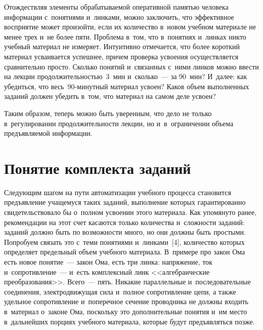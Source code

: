 \begin{multicols}{2}
  Отождествляя элементы обрабатываемой оперативной памятью человека 
информации с~понятиями и~линками, можно заключить, что эффективное 
восприятие может произойти, если их количество в~новом учебном материале 
не менее трех и~не более пяти. Проблема в~том, что в~понятиях и~линках никто 
учебный материал не измеряет. Интуитивно отмечается, что более короткий 
материал усваивается успешнее, причем проверка усвоения осуществляется 
сравнительно просто. Сколько понятий и~связанных с~ними линков можно 
ввести на лекции продолжительностью~3~мин и~сколько~--- за 90~мин? 
И~далее: как убедиться, что весь~90-ми\-нут\-ный материал усвоен? Каков объем 
выполненных заданий должен убедить в~том, что материал на самом деле 
усвоен? 
  
  Таким образом, теперь можно быть уверенным, что дело не только 
в~регулировании продолжительности лекции, но и~в~ограничении объема 
предъявляемой информации.
  
\section{Понятие комплекта заданий}
  Следующим шагом на пути автоматизации учебного процесса становится 
предъявление учащемуся таких заданий, выполнение которых гарантированно 
свидетельствовало бы о~полном усвоении этого материала. Как упомянуто 
ранее, рекомендации на этот счет касаются только количества и~слож\-ности 
заданий: заданий должно быть по возможности много, но они должны быть 
простыми. Попробуем связать это с~теми понятиями и~линками~[4], количество 
которых определяет предельный объем учебного материала. В~примере про 
закон Ома есть новое понятие~--- закон Ома, есть три линка: напряжение, ток 
и~сопротивление~--- и~есть комплексный линк <<алгебраические 
преобразования>>. Всего~--- пять. Никакие параллельные и~последовательные 
соединения, электродвижущая сила и~полное сопротивление цепи, а также удельное 
сопротивление и~поперечное сечение проводника не должны входить 
в~материал о~законе Ома, поскольку это дополнительные понятия и~им место 
в~дальнейших порциях учебного материала, которые будут предъявляться 
позже. 
  

\end{multicols}
